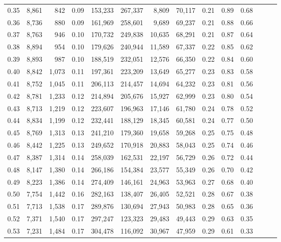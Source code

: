 \begin{tabular}{rrrrrrrrrrrrrr}
0.35 &  8,861 &    842 &  0.09 &  153,233 &  267,337 &   8,809 &  70,117 &  0.21 &  0.89 &      0.68 \\
0.36 &  8,736 &    880 &  0.09 &  161,969 &  258,601 &   9,689 &  69,237 &  0.21 &  0.88 &      0.66 \\
0.37 &  8,763 &    946 &  0.10 &  170,732 &  249,838 &  10,635 &  68,291 &  0.21 &  0.87 &      0.64 \\
0.38 &  8,894 &    954 &  0.10 &  179,626 &  240,944 &  11,589 &  67,337 &  0.22 &  0.85 &      0.62 \\
0.39 &  8,893 &    987 &  0.10 &  188,519 &  232,051 &  12,576 &  66,350 &  0.22 &  0.84 &      0.60 \\
0.40 &  8,842 &  1,073 &  0.11 &  197,361 &  223,209 &  13,649 &  65,277 &  0.23 &  0.83 &      0.58 \\
0.41 &  8,752 &  1,045 &  0.11 &  206,113 &  214,457 &  14,694 &  64,232 &  0.23 &  0.81 &      0.56 \\
0.42 &  8,781 &  1,233 &  0.12 &  214,894 &  205,676 &  15,927 &  62,999 &  0.23 &  0.80 &      0.54 \\
0.43 &  8,713 &  1,219 &  0.12 &  223,607 &  196,963 &  17,146 &  61,780 &  0.24 &  0.78 &      0.52 \\
0.44 &  8,834 &  1,199 &  0.12 &  232,441 &  188,129 &  18,345 &  60,581 &  0.24 &  0.77 &      0.50 \\
0.45 &  8,769 &  1,313 &  0.13 &  241,210 &  179,360 &  19,658 &  59,268 &  0.25 &  0.75 &      0.48 \\
0.46 &  8,442 &  1,225 &  0.13 &  249,652 &  170,918 &  20,883 &  58,043 &  0.25 &  0.74 &      0.46 \\
0.47 &  8,387 &  1,314 &  0.14 &  258,039 &  162,531 &  22,197 &  56,729 &  0.26 &  0.72 &      0.44 \\
0.48 &  8,147 &  1,380 &  0.14 &  266,186 &  154,384 &  23,577 &  55,349 &  0.26 &  0.70 &      0.42 \\
0.49 &  8,223 &  1,386 &  0.14 &  274,409 &  146,161 &  24,963 &  53,963 &  0.27 &  0.68 &      0.40 \\
0.50 &  7,754 &  1,442 &  0.16 &  282,163 &  138,407 &  26,405 &  52,521 &  0.28 &  0.67 &      0.38 \\
0.51 &  7,713 &  1,538 &  0.17 &  289,876 &  130,694 &  27,943 &  50,983 &  0.28 &  0.65 &      0.36 \\
0.52 &  7,371 &  1,540 &  0.17 &  297,247 &  123,323 &  29,483 &  49,443 &  0.29 &  0.63 &      0.35 \\
0.53 &  7,231 &  1,484 &  0.17 &  304,478 &  116,092 &  30,967 &  47,959 &  0.29 &  0.61 &      0.33 \\

\end{tabular}
